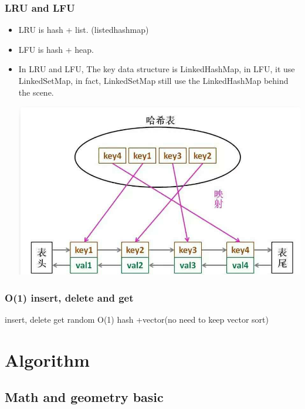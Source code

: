 \documentclass[a4paper,11pt,twoside]{book}
\begin{document}
\subsection{LRU and LFU}
\begin{itemize}
	\item  LRU is hash + list. (listedhashmap)
	\item  LFU is hash + heap.
	\item In LRU and LFU, The key data structure is LinkedHashMap, in LFU, it use LinkedSetMap, in fact, LinkedSetMap still use the LinkedHashMap behind the scene. 
\begin{center}
	\includegraphics[width=0.7\linewidth]{pics/LinkedHashMap}
\end{center}
	


\end{itemize}

	
\subsection{O(1) insert, delete and get}
insert, delete get random O(1)  hash +vector(no need to keep vector sort)
	

\chapter{Algorithm}
\section{Math and geometry basic}
\end{document}
